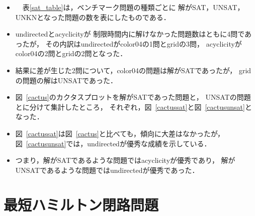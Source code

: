 \begin{itemize}
\item　表\ref{sat_table}は，ベンチマーク問題の種類ごとに
  解がSAT，UNSAT，UNKNとなった問題の数を表にしたものである．
\item \textsf{undirected}と\textsf{acyclicity}が
  制限時間内に解けなかった問題数はともに4問であったが，
  その内訳は\textsf{undirected}がcolor04の1問とgridの3問，
  \textsf{acyclicity}がcolor04の2問とgridの2問となった．
\item 結果に差が生じた2問について，color04の問題は解がSATであったが，
  gridの問題の解はUNSATであった．
\item 図~\ref{cactus}のカクタスプロットを解がSATであった問題と，
  UNSATの問題とに分けて集計したところ，
  それぞれ，図~\ref{cactussat}と図~\ref{cactusunsat}となった．
\item 図~\ref{cactussat}は図~\ref{cactus}と比べても，傾向に大差はなかったが，
  図~\ref{cactusunsat}では，\textsf{undirected}が優秀な成績を示している．
\item つまり，解がSATであるような問題では\textsf{acyclicity}が優秀であり，
  解がUNSATであるような問題では\textsf{undirected}が優秀であった．
\end{itemize}


\section{最短ハミルトン閉路問題}


